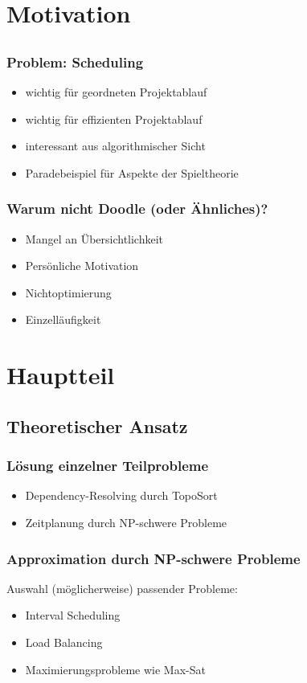 \documentclass[%
]{beamer}
\begin{document}
\section{Motivation}
	\subsection{}
		\begin{frame}
			\frametitle{Problem: Scheduling}
			\begin{itemize}
				\item wichtig für geordneten Projektablauf\pause
				\item wichtig für effizienten Projektablauf\pause
				\item interessant aus algorithmischer Sicht\pause
				\item Paradebeispiel für Aspekte der Spieltheorie
			\end{itemize}
		\end{frame}
		\begin{frame}
			\frametitle{Warum nicht Doodle (oder Ähnliches)?}
			\begin{itemize}
				\item Mangel an Übersichtlichkeit
				\item Persönliche Motivation
				\item Nichtoptimierung
				\item Einzelläufigkeit
			\end{itemize}
		\end{frame}
\section{Hauptteil}
	\subsection{Theoretischer Ansatz}	
		\begin{frame}
			\frametitle{Lösung einzelner Teilprobleme}
			\begin{itemize}
				\item Dependency-Resolving durch TopoSort
				\item Zeitplanung durch NP-schwere Probleme
			\end{itemize}
		\end{frame}
		\begin{frame}
				\frametitle{Approximation durch NP-schwere Probleme}
				Auswahl (möglicherweise) passender Probleme:
				\begin{itemize}
					\item Interval Scheduling
					\item Load Balancing
					\item Maximierungsprobleme wie Max-Sat
				\end{itemize}
		\end{frame}
\end{document}

